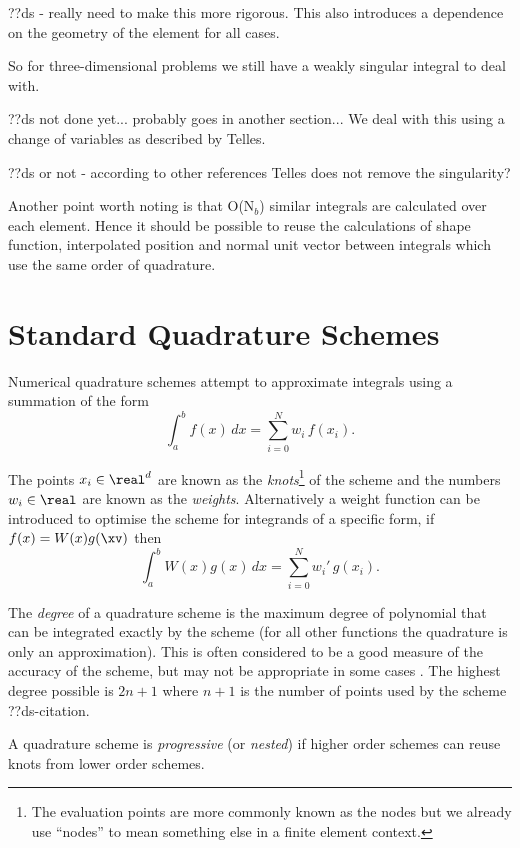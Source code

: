 ??ds - really need to make this more rigorous. This also introduces a dependence on the geometry of the element for all cases.

So for three-dimensional problems we still have a weakly singular integral to deal with.

??ds not done yet... probably goes in another section... We deal with this using a change of variables as described by Telles\cite{Telles1987}.

??ds or not - according to other references Telles does not remove the singularity?

Another point worth noting is that O(N$_b$) similar integrals are calculated over each element.
Hence it should be possible to reuse the calculations of shape function, interpolated position and normal unit vector between integrals which use the same order of quadrature.

\section{Standard Quadrature Schemes}

Numerical quadrature schemes attempt to approximate integrals using a summation of the form
\[ \int_a^b f(x) \, dx = \sum_{i=0}^N w_i \, f(x_i). \]

The points $x_i \in \real^d$ are known as the \emph{knots}\footnote{The evaluation points are more commonly known as the nodes but we already use ``nodes'' to mean something else in a finite element context.} of the scheme and the numbers $w_i \in \real$ are known as the \emph{weights}.
Alternatively a weight function can be introduced to optimise the scheme for integrands of a specific form, if $f(x) = W(x) g(\xv)$ then
\begin{equation}
  \label{eq:9}
  \int_a^b W(x) g(x) \, dx = \sum_{i=0}^N w_i' \, g(x_i).
\end{equation}

The \emph{degree} of a quadrature scheme is the maximum degree of polynomial that can be integrated exactly by the scheme (for all other functions the quadrature is only an approximation).
This is often considered to be a good measure of the accuracy of the scheme, but may not be appropriate in some cases \cite{Trefethen2008}.
The highest degree possible is $2n + 1$ where $n + 1$ is the number of points used by the scheme ??ds-citation.

A quadrature scheme is \emph{progressive} (or \emph{nested}) if higher order schemes can reuse knots from lower order schemes.

